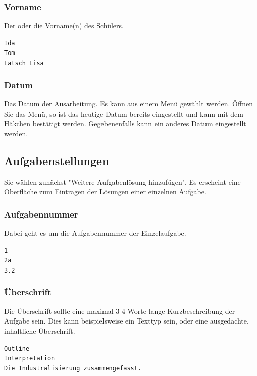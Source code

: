 \documentclass[]{article}
\begin{document}
	\subsubsection{Vorname}
	Der oder die Vorname(n) des Schülers.
	\begin{tcolorbox}[example, title=Beispiel: Vorname]
		\hspace*{15pt}\texttt{Ida}\\
		\hspace*{15pt}\texttt{Tom}\\
		\hspace*{15pt}\texttt{Latsch Lisa}
	\end{tcolorbox}
	
	\subsubsection{Datum}
	Das Datum der Ausarbeitung. Es kann aus einem Menü gewählt werden. Öffnen Sie das Menü, so ist das heutige Datum bereits eingestellt und kann mit dem Häkchen bestätigt werden. Gegebenenfalls kann ein anderes Datum eingestellt werden.
	
	\newpage
	\subsection{Aufgabenstellungen}
	Sie wählen zunächst "Weitere Aufgabenlösung hinzufügen". Es erscheint eine Oberfläche zum Eintragen der Lösungen einer einzelnen Aufgabe.
	\subsubsection{Aufgabennummer}
	Dabei geht es um die Aufgabennummer der Einzelaufgabe.
	\begin{tcolorbox}[example, title=Beispiel: Aufgabennummer]
		\hspace*{15pt}\texttt{1}\\
		\hspace*{15pt}\texttt{2a}\\
		\hspace*{15pt}\texttt{3.2}
	\end{tcolorbox}
	\subsubsection{Überschrift}
	Die Überschrift sollte eine maximal 3-4 Worte lange Kurzbeschreibung der Aufgabe sein. Dies kann beispielsweise ein Texttyp sein, oder eine ausgedachte, inhaltliche Überschrift.
	\begin{tcolorbox}[example, title=Beispiel: Überschrift]
		\hspace*{15pt}\texttt{Outline}\\
		\hspace*{15pt}\texttt{Interpretation}\\
		\hspace*{15pt}\texttt{Die Industralisierung zusammengefasst.}
	\end{tcolorbox}
	
\end{document}
